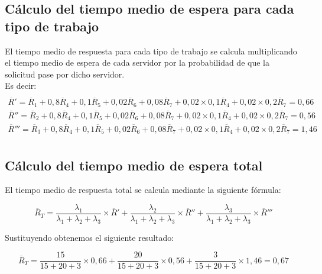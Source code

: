 \subsection{Cálculo del tiempo medio de espera para cada tipo de trabajo}
El tiempo medio de respuesta para cada tipo de trabajo se calcula multiplicando el tiempo medio de espera de cada servidor por la probabilidad de que la solicitud pase por dicho servidor.\\

Es decir:
\begin{multline}\\
\overline{R}' = \overline{R}_{1} + 0,8\overline{R}_{4} + 0,1\overline{R}_{5} + 0,02\overline{R}_{6} + 0,08\overline{R}_{7} + 0,02\times 0,1\overline{R}_{4} + 0,02\times 0,2\overline{R}_{7} = 0,66\\
\overline{R}'' = \overline{R}_{2} + 0,8\overline{R}_{4} + 0,1\overline{R}_{5} + 0,02\overline{R}_{6} + 0,08\overline{R}_{7} + 0,02\times 0,1\overline{R}_{4} + 0,02\times 0,2\overline{R}_{7} = 0,56\\
\overline{R}''' = \overline{R}_{3} + 0,8\overline{R}_{4} + 0,1\overline{R}_{5} + 0,02\overline{R}_{6} + 0,08\overline{R}_{7} + 0,02\times 0,1\overline{R}_{4} + 0,02\times 0,2\overline{R}_{7} = 1,46\\
\end{multline}

\subsection{Cálculo del tiempo medio de espera total}
El tiempo medio de respuesta total se calcula mediante la siguiente fórmula:

\begin{equation}
\overline{R}_{T} = \frac{\lambda_{1}}{\lambda_{1}+\lambda_{2}+\lambda_{3}}\times \overline{R}' + \frac{\lambda_{2}}{\lambda_{1}+\lambda_{2}+\lambda_{3}}\times \overline{R}'' + \frac{\lambda_{3}}{\lambda_{1}+\lambda_{2}+\lambda_{3}}\times \overline{R}'''
\end{equation}

Sustituyendo obtenemos el siguiente resultado:

\begin{equation}
\overline{R}_{T} = \frac{15}{15+20+3}\times 0,66 + \frac{20}{15+20+3}\times 0,56 + \frac{3}{15+20+3}\times 1,46 = 0,67
\end{equation}